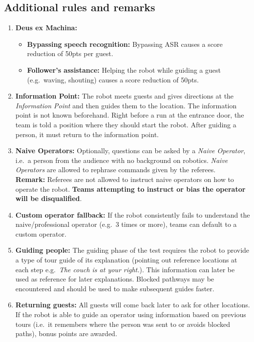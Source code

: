 \subsection*{Additional rules and remarks}
\begin{enumerate}[nosep]
	\item \textbf{Deus ex Machina:}
	\begin{itemize}[nosep]
		\item \textbf{Bypassing speech recognition:} Bypassing ASR causes a score reduction of 50pts per guest.

		\item \textbf{Follower's assistance:} Helping the robot while guiding a guest (e.g.~waving, shouting) causes a score reduction of 50pts.
	\end{itemize}

	\item \textbf{Information Point:} The robot meets guests and gives directions at the \emph{Information Point} and then guides them to the location. The information point is not known beforehand. Right before a run at the entrance door, the team is told a position where they should start the robot.
	After guiding a person, it must return to the information point.

	\item \textbf{Naive Operators:} Optionally, questions can be asked by a \emph{Naive Operator}, i.e.~a person from the audience with no background on robotics. \emph{Naive Operators} are allowed to rephrase commands given by the referees.
	\\\textbf{Remark:} Referees are not allowed to instruct naive operators on how to operate the robot. \textbf{Teams attempting to instruct or bias the operator will be disqualified}.

	\item \textbf{Custom operator fallback:} If the robot consistently fails to understand the naive/professional operator (e.g.~3 times or more), teams can default to a custom operator.

	\item \textbf{Guiding people:} The guiding phase of the test requires the robot to provide a type of tour guide of its explanation (pointing out reference locations at each step e.g.~\emph{The couch is at your right.}). This information can later be used as reference for later explanations. Blocked pathways may be encountered and should be used to make subsequent guides faster.

	\item \textbf{Returning guests:} All guests will come back later to ask for other locations.
	If the robot is able to guide an operator using information based on previous tours (i.e.~it remembers where the person was sent to or avoids blocked paths), bonus points are awarded.
\end{enumerate}

